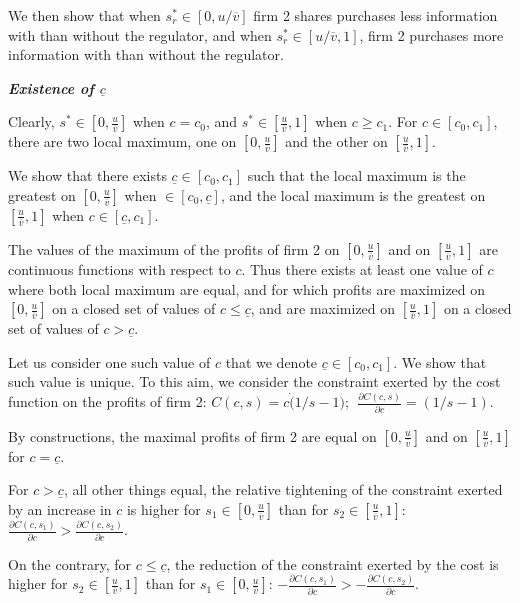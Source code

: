 \documentclass[a4paper,leqno]{article}%
\newcommand{\ov}{\overline{v}}
\begin{document}
We then show that when $s_r^*\in[0,u/\ov]$ firm 2 shares purchases less information with than without the regulator, and when $s_r^*\in[u/\ov,1]$, firm 2 purchases more information with than without the regulator.


\textbf{\textit{Existence of $\underline{c}$}}

Clearly, $s^*\in[0,\frac{u}{\ov}]$ when $c=c_0$, and $s^*\in[\frac{u}{\ov},1]$ when $c\geq c_1$. For $c\in[c_0,c_1]$, there are two local maximum, one on $[0,\frac{u}{\ov}]$ and the other on $[\frac{u}{\ov},1]$. 

\medskip

We show that there exists $\underline{c}\in[c_0,c_1]$ such that the local maximum is the greatest on $[0,\frac{u}{\ov}]$ when $\in[c_0,\underline{c}]$, and the local maximum is the greatest on $[\frac{u}{\ov},1]$ when $c\in[\underline{c},c_1]$.

\medskip

The values of the maximum of the profits of firm 2 on $[0,\frac{u}{\ov}]$ and on $[\frac{u}{\ov},1]$ are continuous functions with respect to $c$. Thus there exists at least one value of $c$ where both local maximum are equal, and for which profits are maximized on $[0,\frac{u}{\ov}]$ on a closed set of values of $c\leq\underline{c}$, and are maximized on $[\frac{u}{\ov},1]$ on a closed set of values of $c>\underline{c}$.

\medskip

Let us consider one such value of $c$ that we denote $\underline{c}\in[c_0,c_1]$. We show that such value is unique. To this aim, we consider the constraint exerted by the cost function on the profits of firm 2: $C(c,s)=c\dot (1/s-1);~~\frac{\partial C(c,s)}{\partial c}=(1/s-1)$.

By constructions, the maximal profits of firm 2 are equal on $[0,\frac{u}{\ov}]$ and
on $[\frac{u}{\ov},1]$ for $c=\underline{c}$.

For $c>\underline{c}$, all other things equal, the relative tightening of the constraint exerted by an increase in $c$ is higher for $s_1\in[0,\frac{u}{\ov}]$ than for $s_2\in[\frac{u}{\ov},1]$: $\frac{\partial C(c,s_1)}{\partial c}>\frac{\partial C(c,s_2)}{\partial c}$. 

\medskip

On the contrary, for $c\leq \underline{c}$, the reduction of the constraint exerted by the cost is higher for $s_2\in[\frac{u}{\ov},1]$ than for $s_1\in[0,\frac{u}{\ov}]$: $-\frac{\partial C(c,s_1)}{\partial c}>-\frac{\partial C(c,s_2)}{\partial c}$.
\end{document}

